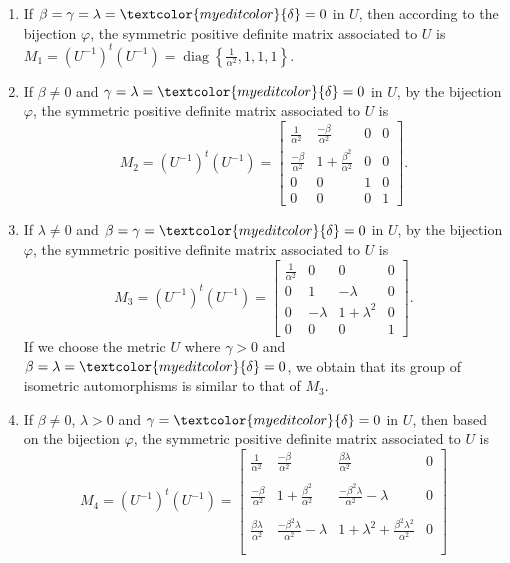 \documentclass[12pt,a4paper,twoside]{article}
\theoremstyle{definition}
\newcommand{\edit}[1]{\textcolor{myeditcolor}{#1}}
\begin{document}
\begin{enumerate}
\item If $\beta = \gamma = \lambda = \edit{\delta} = 0$ in $U$, then according to the bijection $\varphi$, the symmetric positive definite matrix associated to $U$ is $M_1 = (U^{-1})^t(U^{-1}) = \operatorname{diag}\left\lbrace \frac{1}{\alpha^2}, 1, 1, 1\right\rbrace$.
\item If $\beta \neq 0$ and $\gamma = \lambda = \edit{\delta} = 0$ in $U$, by the bijection $\varphi$, the symmetric positive definite matrix associated to $U$ is 
$$M_2 = (U^{-1})^t(U^{-1}) = \begin{bmatrix}
\frac{1}{\alpha^2} & \frac{-\beta}{\alpha^2} & 0 & 0\\
\frac{-\beta}{\alpha^2} & 1 + \frac{\beta^2}{\alpha^2} & 0 & 0\\
0 & 0 & 1 & 0\\
0 & 0 & 0 & 1
\end{bmatrix}.$$
\item If $\lambda \neq 0$ and $\beta = \gamma = \edit{\delta} = 0$ in $U$, by the bijection $\varphi$, the symmetric positive definite matrix associated to $U$ is 
$$M_3 = (U^{-1})^t(U^{-1}) = \begin{bmatrix}
\frac{1}{\alpha^2} & 0 & 0 & 0\\
0 & 1 & -\lambda & 0\\
0 & -\lambda & 1 + \lambda^2 & 0\\
0 & 0 & 0 & 1
\end{bmatrix}.$$
If we choose the metric $U$ where $\gamma > 0$ and $\beta = \lambda = \edit{\delta} = 0$, we obtain that its group of isometric automorphisms is similar to that of $M_3$.
\item If $\beta \neq 0$, $\lambda > 0$ and $\gamma = \edit{\delta} = 0$ in $U$, then based on the bijection $\varphi$, the symmetric positive definite matrix associated to $U$ is 
$$M_4 = (U^{-1})^t(U^{-1}) = \begin{bmatrix}
\frac{1}{\alpha^2} & \frac{-\beta}{\alpha^2} & \frac{\beta\lambda}{\alpha^2} & 0\\
\\
\frac{-\beta}{\alpha^2} & 1 + \frac{\beta^2}{\alpha^2} & \frac{-\beta^2\lambda}{\alpha^2} - \lambda & 0\\
\\
\frac{\beta\lambda}{\alpha^2} & \frac{-\beta^2\lambda}{\alpha^2} - \lambda & 1 + \lambda^2 + \frac{\beta^2\lambda^2}{\alpha^2} & 0\\
\\

\end{bmatrix}$$
\end{enumerate}
\end{document}
